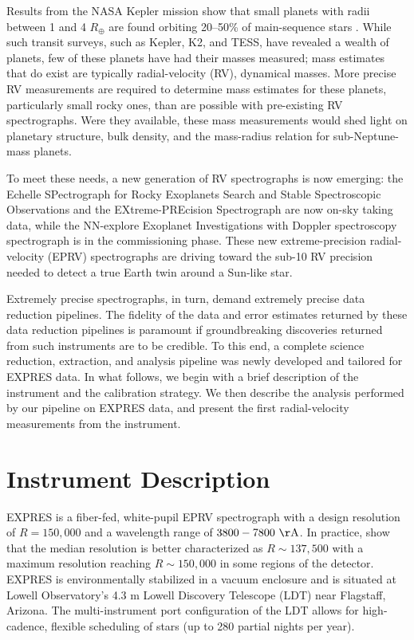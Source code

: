 Results from the NASA Kepler mission show that small planets with radii between 1 and 4 $R_{\oplus}$ are found orbiting 20--50\% of main-sequence stars \citep{winn_occurrence_2015}. While such transit surveys, such as Kepler, K2, and TESS, have revealed a wealth of planets, few of these planets have had their masses measured; mass estimates that do exist are typically radial-velocity (RV), dynamical masses. More precise RV measurements are required to determine mass estimates for these planets, particularly small rocky ones, than are possible with pre-existing RV spectrographs. Were they available, these mass measurements would shed light on planetary structure, bulk density, and the mass-radius relation for sub-Neptune-mass planets. 

To meet these needs, a new generation of RV spectrographs is now emerging: the Echelle SPectrograph for Rocky Exoplanets Search and Stable Spectroscopic Observations \citep[ESPRESSO:][]{pepe_espresso_2013} and the EXtreme-PREcision Spectrograph \citep[EXPRES:][]{jurgenson_expres_2016} are now on-sky taking data, while the NN-explore Exoplanet Investigations with Doppler spectroscopy spectrograph \citep{schwab_design_2016} is in the commissioning phase. These new extreme-precision radial-velocity (EPRV) spectrographs are driving toward the sub-10 \cms RV precision needed to detect a true Earth twin around a Sun-like star.

Extremely precise spectrographs, in turn, demand extremely precise data reduction pipelines. The fidelity of the data and error estimates returned by these data reduction pipelines is paramount if groundbreaking discoveries returned from such instruments are to be credible. To this end, a complete science reduction, extraction, and analysis pipeline was newly developed and tailored for EXPRES data. In what follows, we begin with a brief description of the instrument and the calibration strategy. We then describe the analysis performed by our pipeline on EXPRES data, and present the first radial-velocity measurements from the instrument.

\section{Instrument Description}\label{instrument-description}

EXPRES is a fiber-fed, white-pupil EPRV spectrograph with a design resolution of $R = 150,000$ and a wavelength range of $3800-7800~\mathrm{\AA}$. In practice, \citet{blackman_performance_2020} show that the median resolution is better characterized as $R \sim 137,500$ with a maximum resolution reaching $R \sim 150,000$ in some regions of the detector. EXPRES is environmentally stabilized in a vacuum enclosure and is situated at Lowell Observatory's 4.3 m Lowell Discovery Telescope (LDT) near Flagstaff, Arizona. The multi-instrument port configuration of the LDT allows for high-cadence, flexible scheduling of stars (up to 280 partial nights per year).

